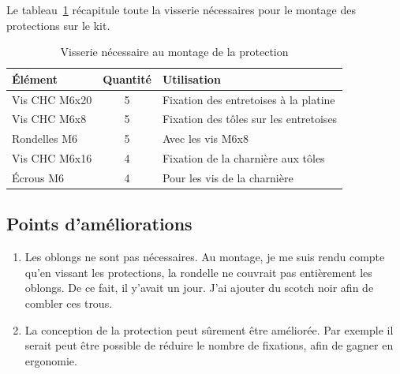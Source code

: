 \begin{minipage}{\textwidth}
    Le tableau~\ref{tab:visserie_protection} récapitule toute la visserie nécessaires pour le montage des protections sur le kit.
    \begin{table}[H]
        \centering
        \renewcommand{\arraystretch}{1.3}
        \begin{tabular}{|l|c|l|}
            \hline
            \textbf{Élément} & \textbf{Quantité} & \textbf{Utilisation}                   \\
            \hline
            Vis CHC M6x20    & 5                 & Fixation des entretoises à la platine  \\
            Vis CHC M6x8     & 5                 & Fixation des tôles sur les entretoises \\
            Rondelles M6     & 5                 & Avec les vis M6x8                      \\
            Vis CHC M6x16    & 4                 & Fixation de la charnière aux tôles     \\
            Écrous M6        & 4                 & Pour les vis de la charnière           \\
            \hline
        \end{tabular}
        \caption{Visserie nécessaire au montage de la protection}
        \label{tab:visserie_protection}
    \end{table}
\end{minipage}
\subsection{Points d'améliorations}
\begin{enumerate}
    \item Les oblongs ne sont pas nécessaires. Au montage, je me suis rendu compte qu'en vissant les protections, la rondelle ne couvrait pas entièrement les oblongs. De ce fait, il y'avait un jour. J'ai ajouter du scotch noir afin de combler ces trous.
    \item La conception de la protection peut sûrement être améliorée. Par exemple il serait peut être possible de réduire le nombre de fixations, afin de gagner en ergonomie.
\end{enumerate}
\clearpage